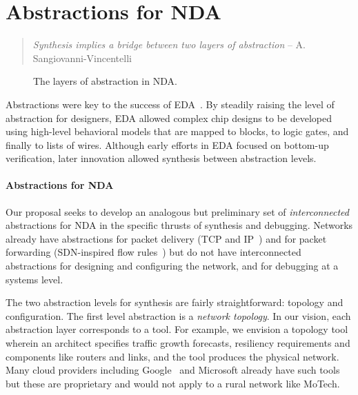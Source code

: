 \section{Abstractions for NDA}
\label{sec:abstractions}

\begin{quote}
{\em Synthesis implies a bridge between two layers of abstraction} -- A. Sangiovanni-Vincentelli~\cite{alberto}
\vspace{-2mm}
\end{quote}

\begin{figure}[t]
\centerline{
}
\caption{\label{fig:abstractions} The layers of abstraction in NDA.}
\vspace{-5mm}
\end{figure}

Abstractions were key to the success of EDA~\cite{malik}. By steadily
raising the level of abstraction for designers, EDA allowed complex
chip designs to be developed using high-level behavioral models that
are mapped to blocks, to logic gates, and finally to lists of
wires. Although early efforts in EDA focused on bottom-up
verification, later innovation allowed synthesis between abstraction
levels.

\paragraph*{Abstractions for NDA}
%
Our proposal seeks to develop an analogous but preliminary set of \emph{interconnected} abstractions for NDA in the specific thrusts of synthesis and debugging. Networks already have
abstractions for packet delivery (TCP and IP~\cite{kurose}) and for
packet forwarding (SDN-inspired flow
rules~\cite{Ethane,4DControlPlane,shenker-abstractions}) but do not have interconnected abstractions for
designing and configuring the network, and for debugging at a systems level.

The two abstraction levels for synthesis are fairly straightforward: topology and configuration. 
The first level abstraction is a {\em network topology}.  In our vision, each
abstraction layer corresponds to a tool.  For example, we envision a topology tool wherein an architect specifies traffic growth forecasts, resiliency requirements and components like routers and links, and the tool produces the physical network.  Many cloud providers including Google~\cite{condor} and Microsoft already have such tools but these are proprietary and would not apply to a rural network like MoTech.  

